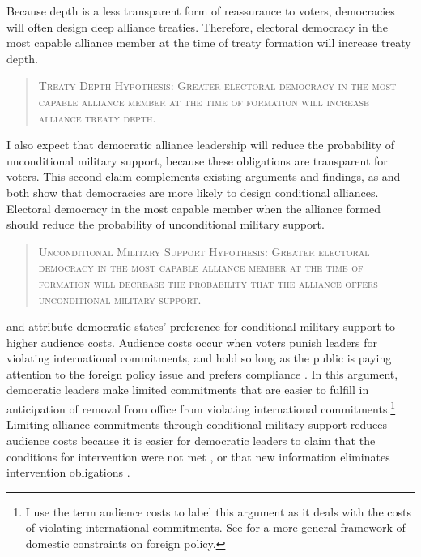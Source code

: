 \documentclass[12pt]{article}
\begin{document}
Because depth is a less transparent form of reassurance to voters, democracies will often design deep alliance treaties. 
Therefore, electoral democracy in the most capable alliance member at the time of treaty formation will increase treaty depth. 


\begin{quote}
\textsc{Treaty Depth Hypothesis: Greater electoral democracy in the most capable alliance member at the time of formation will increase alliance treaty depth.}
\end{quote}   


I also expect that democratic alliance leadership will reduce the probability of unconditional military support, because these obligations are transparent for voters. 
This second claim complements existing arguments and findings, as \citet{Mattes2012} and \citet{Chibaetal2015} both show that democracies are more likely to design conditional alliances. 
Electoral democracy in the most capable member when the alliance formed should reduce the probability of unconditional military support.


\begin{quote}
\textsc{Unconditional Military Support Hypothesis: Greater electoral democracy in the most capable alliance member at the time of formation will decrease the probability that the alliance offers unconditional military support.}
\end{quote} 


\citet{Mattes2012} and \citet{Chibaetal2015} attribute democratic states' preference for conditional military support to higher audience costs. 
Audience costs occur when voters punish leaders for violating international commitments, and hold so long as the public is paying attention to the foreign policy issue \citep{Slantchev2006, PotterBaum2014} and prefers compliance \citep{Chaudoin2014, KertzerBrutger2016}.  
In this argument, democratic leaders make limited commitments that are easier to fulfill in anticipation of removal from office from violating international commitments.\footnote{I use the term audience costs to label this argument as it deals with the costs of violating international commitments. See \citet{HydeSaunders2020} for a more general framework of domestic constraints on foreign policy.} 
Limiting alliance commitments through conditional military support reduces audience costs because it is easier for democratic leaders to claim that the conditions for intervention were not met \citep{FjelstulReiter2019}, or that new information eliminates intervention obligations \citep{LevenduskyHorowitz2012}. 
\end{document}
